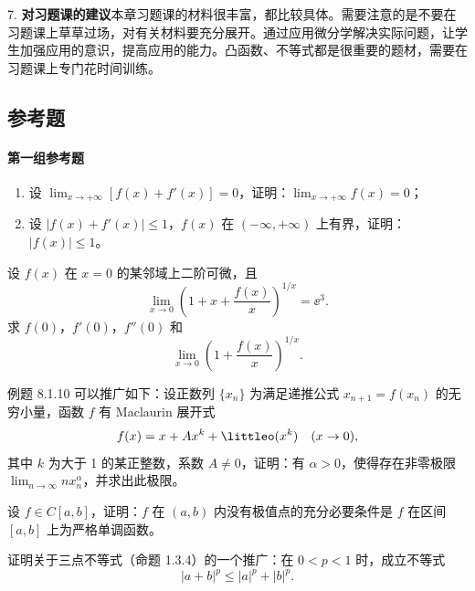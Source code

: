 7. \textbf{对习题课的建议}\quad 本章习题课的材料很丰富，都比较具体。需要注意的是不要在习题课上草草过场，对有关材料要充分展开。通过应用微分学解决实际问题，让学生加强应用的意识，提高应用的能力。凸函数、不等式都是很重要的题材，需要在习题课上专门花时间训练。

\subsection{参考题}

\paragraph{第一组参考题}

\begin{xreferenceproblem}[1]
\begin{enumerate}[label=(\arabic*)]
    \item 设 $\displaystyle\lim_{x\to+\infty}[f(x)+f'(x)]=0$，证明：$\displaystyle\lim_{x\to+\infty}f(x)=0$；
    \item 设 $|f(x)+f'(x)|\le1$，$f(x)$ 在 $(-\infty,+\infty)$ 上有界，证明：$|f(x)|\le1$。
  \end{enumerate}
\end{xreferenceproblem}

\begin{xreferenceproblem}[2]
设 $f(x)$ 在 $x=0$ 的某邻域上二阶可微，且
  \[
    \lim_{x\to0}\left(1+x+\frac{f(x)}x\right)^{1/x}=\ee^3.
  \]
  求 $f(0)$，$f'(0)$，$f''(0)$ 和
  \[
    \lim_{x\to0}\left(1+\frac{f(x)}x\right)^{1/x}.
  \]
\end{xreferenceproblem}

\begin{xreferenceproblem}[3]
例题 8.1.10 可以推广如下：设正数列 $\{x_n\}$ 为满足递推公式 $x_{n+1}=f(x_n)$ 的无穷小量，函数 $f$ 有 Maclaurin 展开式
  \[
    f(x)=x+Ax^k+\littleo(x^k)\quad(x\to0),
  \]
  其中 $k$ 为大于 1 的某正整数，系数 $A\ne0$，证明：有 $\alpha>0$，使得存在非零极限 $\displaystyle\lim_{n\to\infty}nx_n^\alpha$，并求出此极限。
\end{xreferenceproblem}

\begin{xreferenceproblem}[4]
设 $f\in C[a,b]$，证明：$f$ 在 $(a,b)$ 内没有极值点的充分必要条件是 $f$ 在区间 $[a,b]$ 上为严格单调函数。
\end{xreferenceproblem}

\begin{xreferenceproblem}[5]
证明关于三点不等式（命题 1.3.4）的一个推广：在 $0<p<1$ 时，成立不等式
  \[
    |a+b|^p\le|a|^p+|b|^p.
  \]
\end{xreferenceproblem}


